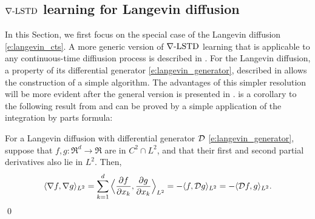 \subsection{$\nabla\text{-LSTD}$ learning for Langevin diffusion}
\label{s:diff_td_langevin}
In this Section, we first focus on the special case of the Langevin diffusion \eqref{e:langevin_cts}. A more generic version of $\nabla\text{-LSTD}$ learning that is applicable to any continuous-time diffiusion process is described in . For the Langevin diffusion, a property of its differential generator \eqref{e:langevin_generator},  described in  allows the construction of a simple algorithm. The advantages of this simpler resolution will be more evident after the general version is presented in .  is a corollary to the following result from \cite{hwanorwu15,yanlaumehmey16} and can be proved by a simple application of the integration by parts formula:
\begin{proposition}
	\label{prop:lang_generator_grad}
	For a Langevin diffusion with differential generator ${\cal D}$ \eqref{e:langevin_generator}, suppose that $f,g\colon\Re^d \to\Re$ are in $C^2  \cap L^2$, and that their first and second partial derivatives also lie in $L^2$. Then,
	\begin{equation}
	\langle \nabla f, \nabla g \rangle_{L^2} = \sum_{k=1}^d \Big \langle \frac{\partial f}{\partial x_k},  \frac{\partial g} {\partial x_k}\Big \rangle_{L^2}  = - \langle  f, \generate g\rangle_{L^2} = - \langle \generate f , g \rangle_{L^2}.
	\label{e:gradDual}
	\end{equation}
	\qed
\end{proposition} 
